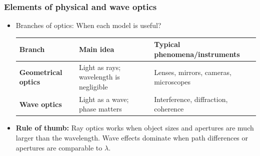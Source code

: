 \documentclass[t,aspectratio=169]{beamer}
\begin{document}
\begin{frame}
\frametitle{Elements of physical and wave optics}
\begin{itemize}
\setlength{\parskip}{0pt}
\setlength{\itemsep}{4pt}
\item Branches of optics: When each model is useful?
\begin{table}
\small
\begin{tabular}{>{\bfseries}p{}p{}p{}}
\toprule
Branch & Main idea & Typical phenomena/instruments \\
\midrule
Geometrical optics & Light as rays; wavelength is negligible & Lenses, mirrors, cameras, microscopes \\
Wave optics & Light as a wave; phase matters & Interference, diffraction, coherence \\
\bottomrule
\end{tabular}
\end{table}
\item \textbf{Rule of thumb:} Ray optics works when object sizes and apertures are much larger than the wavelength. Wave effects dominate when path differences or apertures are comparable to $\lambda$.
  

\end{itemize}
\end{frame}
\end{document}
